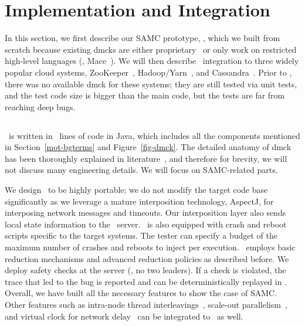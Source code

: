 \section{Implementation and Integration}
\label{sec-impl}

In this section, we first describe our SAMC prototype, \sampro, which we
built from scratch because existing dmcks are either
proprietary~\cite{Yang+09-Modist} or only work on restricted high-level
languages (\eg, Mace~\cite{Killian+07-LifeDeathMaceMC}).  We will then describe
\sampro\ integration to three widely popular cloud systems,
ZooKeeper~\cite{Hunt+10-ZooKeeperPaper}, Hadoop/Yarn~\cite{Kumar+13-Yarn},
and Cassandra~\cite{Lakshman+09-Cassandra}.  Prior to \sampro, there was no
available dmck for these systems; they are still tested via unit tests, and
the test code size is bigger than the main code, but the tests are far from
reaching deep bugs.


\subsection{\sampro}
\label{imp-pro}

\sampro\ is written in \numLinesSamPro\ lines of code in Java, which
includes all the components mentioned in Section~\ref{mot-bgterms} and
Figure~\ref{fig-dmck}.  The detailed anatomy of dmck has been
thoroughly explained in literature~\cite{Guerraoui+11-McNoNetwork,
  Guo+11-Demeter, Killian+07-LifeDeathMaceMC, Simsa+10-Dbug,
  Yang+09-Modist}, and therefore for brevity, we will not discuss many
engineering details.  We will focus on SAMC-related parts.

We design \sampro\ to be highly portable; we do not modify the target code
base significantly as we leverage a mature interposition technology,
AspectJ, for interposing network messages and timeouts.
Our interposition layer also sends local state information to the
\sampro\ server.
\sampro\ is also equipped with crash and reboot scripts specific to the
target systems.  The tester can specify a budget of the maximum number of
crashes and reboots to inject per execution.
\sampro\ employs basic reduction mechanisms and advanced reduction policies
as described before.
We deploy safety checks at the server (\eg, no two leaders).  If a
check is violated, the trace that led to the bug is reported and 
can be deterministically replayed in \sampro.
Overall, we have built all the necessary features to show the case of
SAMC.  Other features such as intra-node thread
interleavings~\cite{Guo+11-Demeter}, scale-out
parallelism~\cite{Simsa+12-ScalablePOR}, and virtual clock for network
delay~\cite{Yang+09-Modist} can be integrated to \sampro\ as well.


